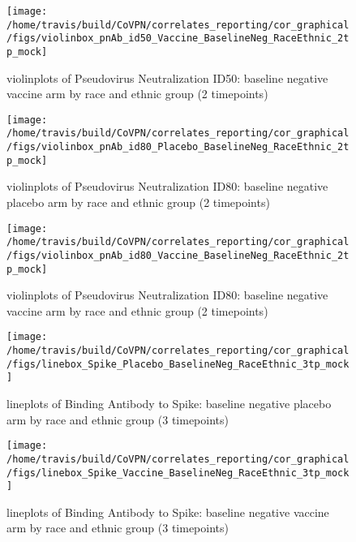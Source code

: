 \documentclass[]{book}
\theoremstyle{definition}
\theoremstyle{definition}
\theoremstyle{definition}
\newcommand{\1}{\mathbbm{1}}
\begin{document}
\clearpage
\begin{figure}[H]

{\centering \texttt{[image: /home/travis/build/CoVPN/correlates\_reporting/cor\_graphical/figs/violinbox\_pnAb\_id50\_Vaccine\_BaselineNeg\_RaceEthnic\_2tp\_mock]} 

}

\caption{violinplots of Pseudovirus Neutralization ID50: baseline negative vaccine arm by race and ethnic group (2 timepoints)}\label{fig:unnamed-chunk-200}
\end{figure}

\clearpage
\begin{figure}[H]

{\centering \texttt{[image: /home/travis/build/CoVPN/correlates\_reporting/cor\_graphical/figs/violinbox\_pnAb\_id80\_Placebo\_BaselineNeg\_RaceEthnic\_2tp\_mock]} 

}

\caption{violinplots of Pseudovirus Neutralization ID80: baseline negative placebo arm by race and ethnic group (2 timepoints)}\label{fig:unnamed-chunk-201}
\end{figure}

\clearpage
\begin{figure}[H]

{\centering \texttt{[image: /home/travis/build/CoVPN/correlates\_reporting/cor\_graphical/figs/violinbox\_pnAb\_id80\_Vaccine\_BaselineNeg\_RaceEthnic\_2tp\_mock]} 

}

\caption{violinplots of Pseudovirus Neutralization ID80: baseline negative vaccine arm by race and ethnic group (2 timepoints)}\label{fig:unnamed-chunk-202}
\end{figure}

\clearpage
\begin{figure}[H]

{\centering \texttt{[image: /home/travis/build/CoVPN/correlates\_reporting/cor\_graphical/figs/linebox\_Spike\_Placebo\_BaselineNeg\_RaceEthnic\_3tp\_mock]} 

}

\caption{lineplots of Binding Antibody to Spike: baseline negative placebo arm by race and ethnic group (3 timepoints)}\label{fig:unnamed-chunk-203}
\end{figure}

\clearpage
\begin{figure}[H]

{\centering \texttt{[image: /home/travis/build/CoVPN/correlates\_reporting/cor\_graphical/figs/linebox\_Spike\_Vaccine\_BaselineNeg\_RaceEthnic\_3tp\_mock]} 

}

\caption{lineplots of Binding Antibody to Spike: baseline negative vaccine arm by race and ethnic group (3 timepoints)}\label{fig:unnamed-chunk-204}
\end{figure}
\end{document}
